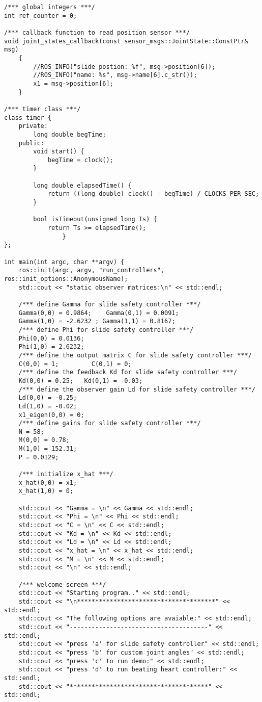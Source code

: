 \begin{lstlisting}[language=gedit]
/*** global integers ***/
int ref_counter = 0;

/*** callback function to read position sensor ***/
void joint_states_callback(const sensor_msgs::JointState::ConstPtr& msg)
    { 
        //ROS_INFO("slide postion: %f", msg->position[6]);
        //ROS_INFO("name: %s", msg->name[6].c_str());
        x1 = msg->position[6];
    }

/*** timer class ***/
class timer {
	private:
		long double begTime;
	public:
		void start() {
			begTime = clock();
		}

		long double elapsedTime() {
			return ((long double) clock() - begTime) / CLOCKS_PER_SEC;
		}

		bool isTimeout(unsigned long Ts) {
			return Ts >= elapsedTime();
        		}
};

int main(int argc, char **argv) {
    ros::init(argc, argv, "run_controllers", ros::init_options::AnonymousName);
    std::cout << "static observer matrices:\n" << std::endl;

    /*** define Gamma for slide safety controller ***/
    Gamma(0,0) = 0.9864;    Gamma(0,1) = 0.0091;
    Gamma(1,0) = -2.6232 ; Gamma(1,1) = 0.8167;
    /*** define Phi for slide safety controller ***/
    Phi(0,0) = 0.0136;      
    Phi(1,0) = 2.6232;
    /*** define the output matrix C for slide safety controller ***/
    C(0,0) = 1;         C(0,1) = 0;
    /*** define the feedback Kd for slide safety controller ***/
    Kd(0,0) = 0.25;   Kd(0,1) = -0.03;
    /*** define the observer gain Ld for slide safety controller ***/
    Ld(0,0) = -0.25;
    Ld(1,0) = -0.02;
    x1_eigen(0,0) = 0;
    /*** define gains for slide safety controller ***/
    N = 58;
    M(0,0) = 0.78;
    M(1,0) = 152.31;
    P = 0.0129;

    /*** initialize x_hat ***/
    x_hat(0,0) = x1;
    x_hat(1,0) = 0;

    std::cout << "Gamma = \n" << Gamma << std::endl;
    std::cout << "Phi = \n" << Phi << std::endl;
    std::cout << "C = \n" << C << std::endl;
    std::cout << "Kd = \n" << Kd << std::endl;
    std::cout << "Ld = \n" << Ld << std::endl;
    std::cout << "x_hat = \n" << x_hat << std::endl;
    std::cout << "M = \n" << M << std::endl;
    std::cout << "\n" << std::endl;

    /*** welcome screen ***/
    std::cout << "Starting program.." << std::endl;
    std::cout << "\n**************************************" << std::endl;
    std::cout << "The following options are avaiable:" << std::endl;
    std::cout << "--------------------------------------" << std::endl;
    std::cout << "press 'a' for slide safety controller" << std::endl;
    std::cout << "press 'b' for custom joint angles" << std::endl;
    std::cout << "press 'c' to run demo:" << std::endl;
    std::cout << "press 'd' to run beating heart controller:" << std::endl;
    std::cout << "**************************************" << std::endl;
    

\end{lstlisting}
